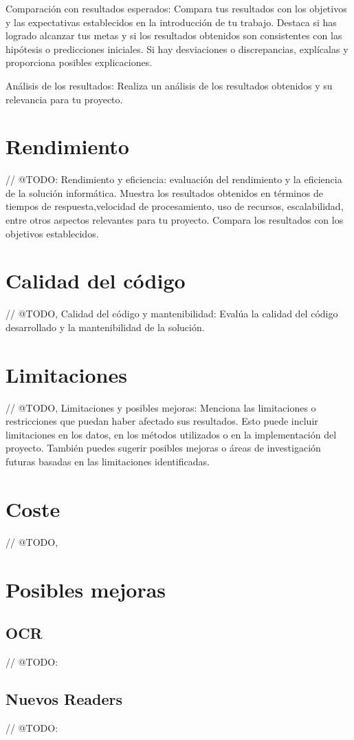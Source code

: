 Comparación con resultados esperados: Compara tus resultados con los objetivos
y las expectativas establecidos en la introducción de tu trabajo.
Destaca si has logrado alcanzar tus metas y si los resultados obtenidos son consistentes con las hipótesis o
predicciones iniciales.
Si hay desviaciones o discrepancias, explícalas y proporciona posibles explicaciones.

Análisis de los resultados: Realiza un análisis de los resultados obtenidos y su relevancia para tu proyecto.


\section{Rendimiento}

// @TODO: Rendimiento y eficiencia: evaluación del rendimiento y la eficiencia de la solución informática.
Muestra los resultados obtenidos en términos de tiempos de respuesta,velocidad de procesamiento, uso de recursos,
escalabilidad, entre otros aspectos relevantes para tu proyecto.
Compara los resultados con los objetivos establecidos.


\section{Calidad del código}

// @TODO, Calidad del código y mantenibilidad:
Evalúa la calidad del código desarrollado y la mantenibilidad de la solución.


\section{Limitaciones}

// @TODO, Limitaciones y posibles mejoras: Menciona las limitaciones o restricciones
que puedan haber afectado sus resultados.
Esto puede incluir limitaciones en los datos, en los métodos utilizados o en la implementación del proyecto.
También puedes sugerir posibles mejoras o áreas de investigación futuras basadas en las limitaciones identificadas.


\section{Coste}
// @TODO,


\section{Posibles mejoras}

\subsection{OCR}
// @TODO:

\subsection{Nuevos Readers}
// @TODO:
